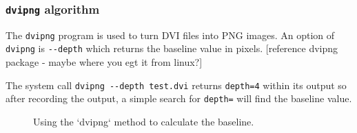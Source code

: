 \documentclass[]{article}
\begin{document}
\subsubsection{\texorpdfstring{\texttt{dvipng}
algorithm}{dvipng algorithm}}\label{dvipng-algorithm}

The \texttt{dvipng} program is used to turn DVI files into PNG images.
An option of \texttt{dvipng} is \texttt{-\/-depth} which returns the
baseline value in pixels. {[}reference dvipng package - maybe where you
egt it from linux?{]}

The system call \texttt{dvipng\ -\/-depth\ test.dvi} returns
\texttt{depth=4} within its output so after recording the output, a
simple search for \texttt{depth=} will find the baseline value.

\begin{figure}
\begin{adjustwidth}{0.5in}{0in}
 \vspace{0.3cm}
 \vspace{0.3cm}
 \vspace{0.3cm}
 \vspace{0.3cm}
 \vspace{0.3cm}
 \vspace{0.3cm}
 \vspace{0.3cm}
 \vspace{0.3cm}
 \vspace{0.3cm}
 \vspace{0.3cm}
 \vspace{0.3cm}
 \vspace{0.3cm}
 \end{adjustwidth}
\caption{Using the `dvipng` method to calculate the baseline.}
\end{figure}
\end{document}
